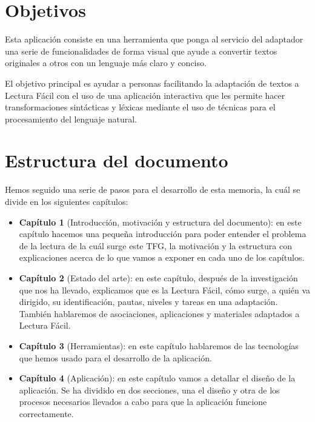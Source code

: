 \section{Objetivos}
Esta aplicación consiste en una herramienta que ponga al servicio del adaptador una serie de funcionalidades de forma visual que ayude a convertir textos originales a otros con un lenguaje más claro y conciso.

 \setlength{\parskip}{10pt}
 
El objetivo principal es ayudar a personas facilitando la adaptación de textos a Lectura Fácil con el uso de una aplicación interactiva que les permite hacer transformaciones sintácticas y léxicas mediante el uso de técnicas para el procesamiento del lenguaje natural. 

 

\section{Estructura del documento}


Hemos seguido una serie de pasos para el desarrollo de esta memoria, la cuál se divide en los siguientes capítulos:

\begin{itemize}
	\item {\textbf{Capítulo 1}} (Introducción, motivación y estructura del documento): en este capítulo hacemos una pequeña introducción para poder entender el problema de la lectura de la cuál surge este TFG, la motivación y la estructura con explicaciones acerca de lo que vamos a exponer en cada uno de los capítulos.
	
 \setlength{\parskip}{10pt}
	
	\item{\textbf{Capítulo 2}} (Estado del arte): en este capítulo, después de la investigación que nos ha llevado, explicamos que es la Lectura Fácil, cómo surge, a quién va dirigido, su identificación, pautas, niveles y tareas en una adaptación. También hablaremos de asociaciones, aplicaciones y materiales adaptados a Lectura Fácil. 

 \setlength{\parskip}{10pt}

\item{\textbf{Capítulo 3}} (Herramientas): en este capítulo hablaremos de las tecnologías que hemos usado para el desarrollo de la aplicación.
 \setlength{\parskip}{10pt}

\item{\textbf{Capítulo 4}} (Aplicación): en este capítulo vamos a detallar el diseño de la aplicación. Se ha dividido en dos secciones, una el diseño y otra de los procesos necesarios llevados a cabo para que la aplicación funcione correctamente.

\end{itemize}

